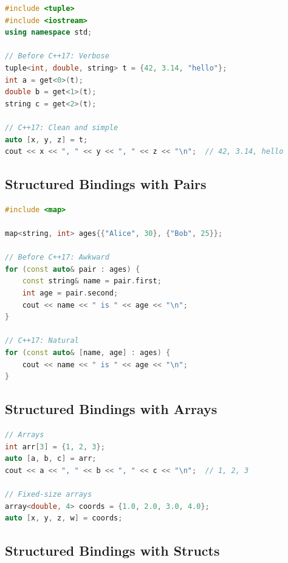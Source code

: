 \begin{lstlisting}[language={C++}]
#include <tuple>
#include <iostream>
using namespace std;

// Before C++17: Verbose
tuple<int, double, string> t = {42, 3.14, "hello"};
int a = get<0>(t);
double b = get<1>(t);
string c = get<2>(t);

// C++17: Clean and simple
auto [x, y, z] = t;
cout << x << ", " << y << ", " << z << "\n";  // 42, 3.14, hello
\end{lstlisting}

\hypertarget{structured-bindings-with-pairs}{%
\subsection{Structured Bindings with
Pairs}\label{structured-bindings-with-pairs}}

\begin{lstlisting}[language={C++}]
#include <map>

map<string, int> ages{{"Alice", 30}, {"Bob", 25}};

// Before C++17: Awkward
for (const auto& pair : ages) {
    const string& name = pair.first;
    int age = pair.second;
    cout << name << " is " << age << "\n";
}

// C++17: Natural
for (const auto& [name, age] : ages) {
    cout << name << " is " << age << "\n";
}
\end{lstlisting}

\hypertarget{structured-bindings-with-arrays}{%
\subsection{Structured Bindings with
Arrays}\label{structured-bindings-with-arrays}}

\begin{lstlisting}[language={C++}]
// Arrays
int arr[3] = {1, 2, 3};
auto [a, b, c] = arr;
cout << a << ", " << b << ", " << c << "\n";  // 1, 2, 3

// Fixed-size arrays
array<double, 4> coords = {1.0, 2.0, 3.0, 4.0};
auto [x, y, z, w] = coords;
\end{lstlisting}

\hypertarget{structured-bindings-with-structs}{%
\subsection{Structured Bindings with
Structs}\label{structured-bindings-with-structs}}

